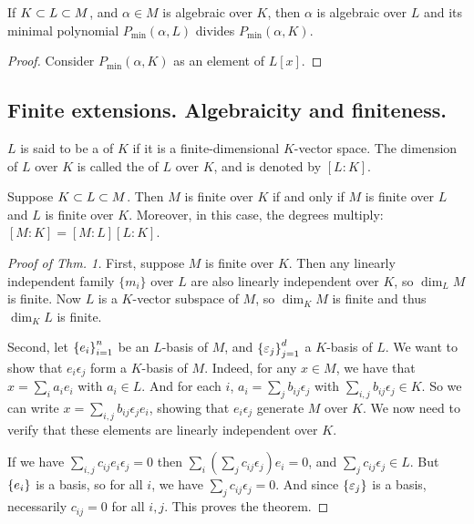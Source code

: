 \begin{prop}
If $K \subset L \subset M$, and $\alpha \in M$ is algebraic over $K$, then $\alpha$ is algebraic over $L$ and its minimal polynomial $P_{\min}(\alpha, L)$ divides $P_{\min}(\alpha, K)$.
\begin{proof}
Consider $P_{\min}(\alpha, K)$ as an element of $L[x]$.
\end{proof}
\end{prop}

\subsection{Finite extensions. Algebraicity and finiteness.}
\begin{defn}
$L$ is said to be a  of $K$ if it is a finite-dimensional $K$-vector space. The dimension of $L$ over $K$ is called the  of $L$ over $K$, and is denoted by $[L:K]$. 
\end{defn}
\begin{thm}
Suppose $K \subset L \subset M$. Then $M$ is finite over $K$ if and only if $M$ is finite over $L$ and $L$ is finite over $K$. Moreover, in this case, the degrees multiply: $[M:K] = [M:L][L:K]$.
\end{thm}
\begin{proof}[Proof of Thm. 1]
First, suppose $M$ is finite over $K$. Then any linearly independent family $\{m_i\}$ over $L$ are also linearly independent over $K$, so $\dim_L M$ is finite. Now $L$ is a $K$-vector subspace of $M$, so $\dim_K M$ is finite and thus $\dim_K L$ is finite.

Second, let $\left\{e_i\right\}_{i = 1}^{n}$ be an $L$-basis of $M$, and $\left\{\varepsilon_j\right\}_{j = 1}^{d}$ a $K$-basis of $L$. We want to show that $e_i \epsilon_j$ form a $K$-basis of $M$. Indeed, for any $x \in M$, we have that $x = \sum_{i} a_i e_i$ with $a_i \in L$. And for each $i$, $a_i = \sum_{j} b_{ij} \epsilon_j$ with $\sum_{i,j} b_{ij}\epsilon_j \in K$. So we can write $x = \sum_{i,j} b_{ij} \epsilon_j e_i$, showing that $e_i \epsilon_j$ generate $M$ over $K$. We now need to verify that these elements are linearly independent over $K$.

If we have $\sum_{i,j} c_{ij} e_i \epsilon_j = 0$ then $\sum_{i} \left(\sum_{j} c_{ij} \epsilon_j\right) e_i = 0$, and $\sum_{j} c_{ij} \epsilon_j \in L$. But $\left\{e_i\right\}$ is a basis, so for all $i$, we have $\sum_{j} c_{ij} \epsilon_j = 0$. And since $\left\{\varepsilon_j\right\}$ is a basis, necessarily $c_{ij} = 0$ for all $i, j$. This proves the theorem.
\end{proof}


